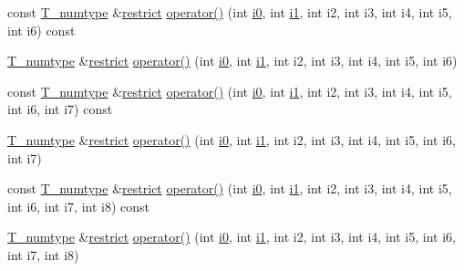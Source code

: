 \begin{DoxyCompactItemize}
\item 
const \hyperlink{classArray_ae72770f4a1d2f8b7193badafc320f008}{T\+\_\+numtype} \&\hyperlink{compiler_8h_a080abdcb9c02438f1cd2bb707af25af8}{restrict} \hyperlink{classArray_ac9ac4222b4333cf21e281428337d502d}{operator()} (int \hyperlink{cephes_8h_aacd2643d920288e61be16787561a4514}{i0}, int \hyperlink{cephes_8h_ab24474d03df1f9adf1700c2c1badd1a5}{i1}, int i2, int i3, int i4, int i5, int i6) const 
\item 
\hyperlink{classArray_ae72770f4a1d2f8b7193badafc320f008}{T\+\_\+numtype} \&\hyperlink{compiler_8h_a080abdcb9c02438f1cd2bb707af25af8}{restrict} \hyperlink{classArray_ae1f10edf11dcd139126c2bc601c883e6}{operator()} (int \hyperlink{cephes_8h_aacd2643d920288e61be16787561a4514}{i0}, int \hyperlink{cephes_8h_ab24474d03df1f9adf1700c2c1badd1a5}{i1}, int i2, int i3, int i4, int i5, int i6)
\item 
const \hyperlink{classArray_ae72770f4a1d2f8b7193badafc320f008}{T\+\_\+numtype} \&\hyperlink{compiler_8h_a080abdcb9c02438f1cd2bb707af25af8}{restrict} \hyperlink{classArray_a0805e7a26dc985ef4dabf3f9cbe0a8c8}{operator()} (int \hyperlink{cephes_8h_aacd2643d920288e61be16787561a4514}{i0}, int \hyperlink{cephes_8h_ab24474d03df1f9adf1700c2c1badd1a5}{i1}, int i2, int i3, int i4, int i5, int i6, int i7) const 
\item 
\hyperlink{classArray_ae72770f4a1d2f8b7193badafc320f008}{T\+\_\+numtype} \&\hyperlink{compiler_8h_a080abdcb9c02438f1cd2bb707af25af8}{restrict} \hyperlink{classArray_a07109b392a392aacea32bb6641dd2262}{operator()} (int \hyperlink{cephes_8h_aacd2643d920288e61be16787561a4514}{i0}, int \hyperlink{cephes_8h_ab24474d03df1f9adf1700c2c1badd1a5}{i1}, int i2, int i3, int i4, int i5, int i6, int i7)
\item 
const \hyperlink{classArray_ae72770f4a1d2f8b7193badafc320f008}{T\+\_\+numtype} \&\hyperlink{compiler_8h_a080abdcb9c02438f1cd2bb707af25af8}{restrict} \hyperlink{classArray_a30e0bf01b5c84c0345f7870390bbf18a}{operator()} (int \hyperlink{cephes_8h_aacd2643d920288e61be16787561a4514}{i0}, int \hyperlink{cephes_8h_ab24474d03df1f9adf1700c2c1badd1a5}{i1}, int i2, int i3, int i4, int i5, int i6, int i7, int i8) const 
\item 
\hyperlink{classArray_ae72770f4a1d2f8b7193badafc320f008}{T\+\_\+numtype} \&\hyperlink{compiler_8h_a080abdcb9c02438f1cd2bb707af25af8}{restrict} \hyperlink{classArray_a3cf3c81a4b8fda25bf0f3e1536b755cf}{operator()} (int \hyperlink{cephes_8h_aacd2643d920288e61be16787561a4514}{i0}, int \hyperlink{cephes_8h_ab24474d03df1f9adf1700c2c1badd1a5}{i1}, int i2, int i3, int i4, int i5, int i6, int i7, int i8)

\end{DoxyCompactItemize}
